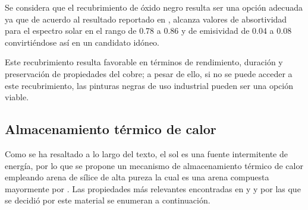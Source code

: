 			Se considera que el recubrimiento de óxido negro resulta ser una opción adecuada ya que de acuerdo al resultado reportado en \cite{lowery_solar_1977}, alcanza valores de absortividad para el espectro solar en el rango de 0.78 a 0.86 y de emisividad de 0.04 a 0.08 convirtiéndose así en un candidato idóneo. 
			
			Este recubrimiento resulta favorable en términos de rendimiento, duración y preservación de propiedades del cobre; a pesar de ello, si no se puede acceder a este recubrimiento, las pinturas negras de uso industrial pueden ser una opción viable.
			
%			
			
		\subsection{Almacenamiento térmico de calor}
			
			Como se ha resaltado a lo largo del texto, el sol es una fuente intermitente de energía, por lo que se propone un mecanismo de almacenamiento térmico de calor empleando arena de sílice de alta pureza la cual es una arena compuesta mayormente por . Las propiedades más relevantes encontradas en \cite{davenport_thermal_2022} y \cite{wypych_2_2021} y por las que se decidió por este material se enumeran a continuación.
			
